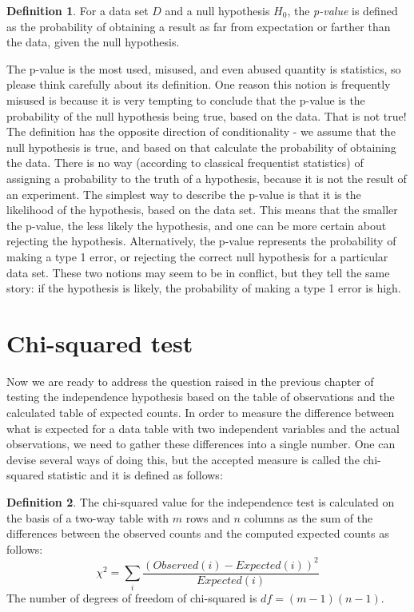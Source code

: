 \documentclass[
]{book}
\theoremstyle{definition}
\newtheorem{definition}{Definition}[chapter]
\theoremstyle{definition}
\theoremstyle{definition}
\theoremstyle{remark}
\begin{document}
\begin{definition}
\protect\hypertarget{def:def-p-val}{}{\label{def:def-p-val} }For a data set \(D\) and a null hypothesis \(H_0\), the \emph{p-value} is defined as the probability of obtaining a result as far from expectation or farther than the data, given the null hypothesis.
\end{definition}

The p-value is the most used, misused, and even abused quantity is statistics, so please think carefully about its definition. One reason this notion is frequently misused is because it is very tempting to conclude that the p-value is the probability of the null hypothesis being true, based on the data. That is not true! The definition has the opposite direction of conditionality - we assume that the null hypothesis is true, and based on that calculate the probability of obtaining the data. There is no way (according to classical frequentist statistics) of assigning a probability to the truth of a hypothesis, because it is not the result of an experiment.
The simplest way to describe the p-value is that it is the likelihood of the hypothesis, based on the data set. This means that the smaller the p-value, the less likely the hypothesis, and one can be more certain about rejecting the hypothesis. Alternatively, the p-value represents the probability of making a type 1 error, or rejecting the correct null hypothesis for a particular data set. These two notions may seem to be in conflict, but they tell the same story: if the hypothesis is likely, the probability of making a type 1 error is high.

\hypertarget{chi-squared-test}{%
\section{Chi-squared test}\label{chi-squared-test}}

Now we are ready to address the question raised in the previous chapter of testing the independence hypothesis based on the table of observations and the calculated table of expected counts. In order to measure the difference between what is expected for a data table with two independent variables and the actual observations, we need to gather these differences into a single number. One can devise several ways of doing this, but the accepted measure is called the chi-squared statistic and it is defined as follows:

\begin{definition}
\protect\hypertarget{def:def-chi-sq}{}{\label{def:def-chi-sq} }The chi-squared value for the independence test is calculated on the basis of a two-way table with \(m\) rows and \(n\) columns as the sum of the differences between the observed counts and the computed expected counts as follows:
\[\chi^2= \sum_i \frac{(Observed(i)-Expected(i))^2}{Expected(i)}\]
The number of degrees of freedom of chi-squared is \(df = (m-1)(n-1)\).
\end{definition}
\end{document}
